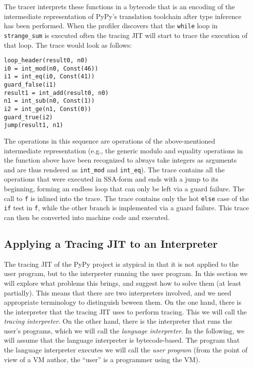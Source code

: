 \documentclass{sig-alternate}
\newcommand\eg{e.g.,\xspace}
\let\oldcite=\cite
\renewcommand\cite[1]{\ifthenelse{\equal{#1}{XXX}}{[citation~needed]}{\oldcite{#1}}}
\begin{document}
The tracer interprets these functions in a bytecode that is an encoding of
the intermediate representation of PyPy's translation toolchain after type
inference has been performed.
When the profiler discovers
that the \texttt{while} loop in \texttt{strange\_sum} is executed often the
tracing JIT will start to trace the execution of that loop.  The trace would
look as follows:
{\small
\begin{verbatim}
loop_header(result0, n0)
i0 = int_mod(n0, Const(46))
i1 = int_eq(i0, Const(41))
guard_false(i1)
result1 = int_add(result0, n0)
n1 = int_sub(n0, Const(1))
i2 = int_ge(n1, Const(0))
guard_true(i2)
jump(result1, n1)
\end{verbatim}
}
The operations in this sequence are operations of the above-mentioned intermediate
representation (\eg the generic modulo and equality operations in the
function above have been recognized to always take integers as arguments and are thus
rendered as \texttt{int\_mod} and \texttt{int\_eq}). The trace contains all the
operations that were executed in SSA-form \cite{cytron_efficiently_1991} and ends with a jump
to its beginning, forming an endless loop that can only be left via a guard
failure. The call to \texttt{f} is inlined into the trace. The trace
contains only the hot \texttt{else} case of the \texttt{if} test in \texttt{f},
while the other branch is implemented via a guard failure. This trace can then
be converted into machine code and executed.



\subsection{Applying a Tracing JIT to an Interpreter}

The tracing JIT of the PyPy project is atypical in that it is not applied to the
user program, but to the interpreter running the user program. In this section
we will explore what problems this brings, and suggest how to solve them (at least
partially). This means that there are two interpreters involved, and we need appropriate
terminology to distinguish beween them. On the one hand, there is the interpreter that
the tracing JIT uses to perform tracing. This we will call the \emph{tracing
interpreter}. On the other hand, there is the interpreter that runs the
user's programs, which we will call the \emph{language interpreter}. In the
following, we will assume that the language interpreter is bytecode-based. The
program that the language interpreter executes we will call the \emph{user
program} (from the point of view of a VM author, the ``user'' is a programmer
using the VM).
\end{document}
